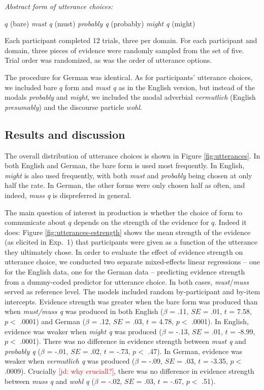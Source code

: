 \documentclass[11pt]{article}
\newcommand{\jd}[1]{\textcolor{Red}{[jd: #1]}}
\newcommand{\figref}[1]{Figure \ref{#1}}
\begin{document}
\begin{exe}
	\ex\label{utterancechoices} \emph{Abstract form of utterance choices:}
	\begin{xlist}
		\ex $q$ (bare)
		\ex \emph{must q} (must)
		\ex \emph{probably q} (probably)
		\ex \emph{might q} (might)
		\end{xlist}
		\end{exe}
		
Each participant completed 12 trials, three per domain. For each participant and domain, three pieces of evidence were randomly sampled from the set of five. Trial order was randomized, as was the order of utterance options.

The procedure for German was identical. As for participants' utterance choices, we included bare $q$ form and \emph{must q} as in the English version, but instead of the modals \emph{probably} and \emph{might}, we included the modal adverbial \emph{vermutlich} (English \emph{presumably}) and the discourse particle \emph{wohl}.

\subsection{Results and discussion}

The overall distribution of utterance choices is shown in \figref{fig:utterances}. In both English and German, the bare form is used most frequently. In English, \emph{might} is also used frequently, with both \emph{must} and \emph{probably} being chosen at only half the rate. In German, the other forms were only chosen half as often, and indeed, \emph{muss q} is dispreferred in general.

The main question of interest in production is whether the choice of form to communicate about $q$ depends on the strength of the evidence for $q$. Indeed it does: \figref{fig:utterances-estrength} shows the mean strength of the evidence (as elicited in Exp.~1) that participants were given as a function of the utterance they ultimately chose.   In order to evaluate the effect of evidence strength on utterance choice, we conducted two separate mixed-effects linear regressions -- one for the English data, one for the German data -- predicting evidence strength from a dummy-coded predictor for utterance choice. In both cases, \emph{must}/\emph{muss} served as reference level. The models included random by-participant and by-item  intercepts. Evidence strength was greater when the bare form was produced than when \emph{must/muss q} was produced in both English ($\beta$ = .11, $SE$ = .01, $t$ = 7.58, $p <$ .0001) and German ($\beta$ = .12, $SE$ = .03, $t$ = 4.78, $p <$ .0001). In English, evidence   was weaker  when \emph{might q} was produced  ($\beta$ = -.13, $SE$ = .01, $t$ = -8.99, $p <$ .0001). There was no difference in evidence strength between \emph{must q} and \emph{probably q}  ($\beta$ = -.01, $SE$ = .02, $t$ = -.73, $p <$ .47). In German, evidence was weaker when \emph{vermutlich q} was produced  ($\beta$ = -.09, $SE$ = .03, $t$ = -3.35, $p <$ .0009). Crucially \jd{why cruciall?}, there was no difference in evidence strength between \emph{muss q} and \emph{wohl q}  ($\beta$ = -.02, $SE$ = .03, $t$ = -.67, $p <$ .51).
\end{document}
